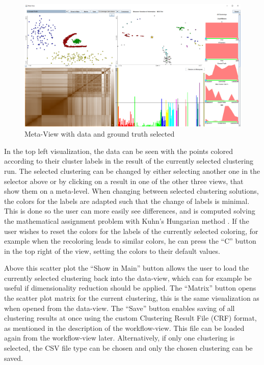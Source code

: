 \documentclass[
	a4paper,
	english,
	twoside,
	openright,               
	11pt                            
	]{report}
\begin{document}
\begin{figure}[H]
	\centering
	\includegraphics[angle=-90,origin=c,scale=.42]{meta-view}
	\caption{Meta-View with data and ground truth selected}
	\label{fig:meta-view}
\end{figure}

In the top left visualization, the data can be seen with the points colored according to their cluster labels in the result of the currently selected clustering run. The selected clustering can be changed by either selecting another one in the selector above or by clicking on a result in one of the other three views, that show them on a meta-level. When changing between selected clustering solutions, the colors for the labels are adapted such that the change of labels is minimal. This is done so the user can more easily see differences, and is computed solving the mathematical assignment problem with Kuhn’s Hungarian method \cite{Kuhn2010}. If the user wishes to reset the colors for the labels of the currently selected coloring, for example when the recoloring leads to similar colors, he can press the ``C'' button in the top right of the view, setting the colors to their default values.

Above this scatter plot the ``Show in Main'' button allows the user to load the currently selected clustering back into the data-view, which can for example be useful if dimensionality reduction should be applied. The ``Matrix'' button opens the scatter plot matrix for the current clustering, this is the same visualization as when opened from the data-view. The ``Save'' button enables saving of all clustering results at once using the custom Clustering Result File (CRF) format, as mentioned in the description of the workflow-view. This file can be loaded again from the workflow-view later. Alternatively, if only one clustering is selected, the CSV file type can be chosen and only the chosen clustering can be saved.
\end{document}
